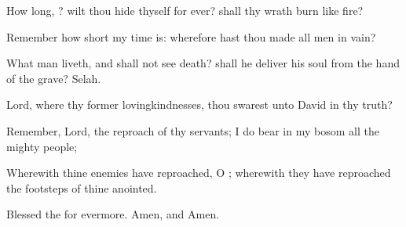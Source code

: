 {\par }{\Q {}How long,
{}? wilt thou
hide thyself for
ever? shall thy
wrath
burn like
fire?
\par }{\Q {}Remember how
short my time is: wherefore hast thou
made all
men in
vain?
\par }{\Q {}What
man
{}
liveth, and shall not
see
death? shall he
deliver his
soul from the
hand of the
grave?
Selah.
\par }{\Q {}Lord, where
{} thy
former
lovingkindnesses,
{} thou
swarest unto
David in thy
truth?
\par }{\Q {}Remember,
Lord, the
reproach of thy
servants;
{} I do
bear in my
bosom
{} all the
mighty
people;
\par }{\Q {}Wherewith thine
enemies have
reproached, O
{}; wherewith they have
reproached the
footsteps of thine
anointed.
\par }{\Q {}Blessed
{} the
{} for
evermore.
Amen, and
Amen.

}
